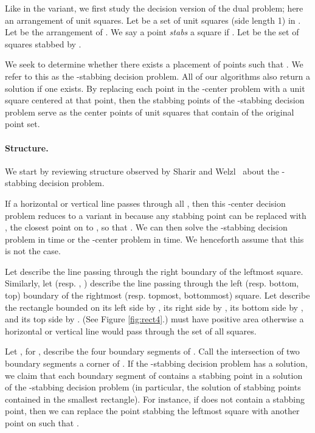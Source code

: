 \documentclass[11pt]{myclass}
\begin{document}
Like in the  variant, we first study the decision version of the dual problem; here an arrangement of unit squares.  
Let  be a set of  unit squares (side length 1) in .  Let  be the arrangement of .  We say a point  \emph{stabs} a square  if .  Let  be the set of squares stabbed by .  

We seek to determine whether there exists a placement of  points  such that .  
We refer to this as the -stabbing decision problem.  
All of our algorithms also return a solution if one exists.  
By replacing each point in the -center problem with a unit square centered at that point, then the  stabbing points of the -stabbing decision problem serve as the center points of unit squares that contain  of the original point set.  


\paragraph{Structure.}
We start by reviewing structure observed by Sharir and Welzl~\cite{SW96} about the -stabbing decision problem.  

If a horizontal or vertical line  passes through all , then this -center decision problem reduces to a variant in  because any stabbing point  can be replaced with , the closest point on  to , so that .  We can then solve the -stabbing decision problem in  time or the -center problem in  time.  
We henceforth assume that this is not the case.  

Let  describe the line passing through the right boundary of the leftmost square.  Similarly, let  (resp. , ) describe the line passing through the left (resp. bottom, top) boundary of the rightmost (resp. topmost, bottommost) square.  
Let  describe the rectangle bounded on its left side by , its right side by , its bottom side by , and its top side by .  (See Figure \ref{fig:rect4}.)
 must have positive area otherwise a horizontal or vertical line would pass through the set of all squares.  

Let , for , describe the four boundary segments of .  Call the intersection of two boundary segments a corner of .  
If the -stabbing decision problem has a solution, we claim that each boundary segment of  contains a stabbing point in a solution of the -stabbing decision problem (in particular, the solution of  stabbing points contained in the smallest rectangle).  For instance, if  does not contain a stabbing point, then we can replace the point  stabbing the leftmost square with another point  on  such that .  
\end{document}
